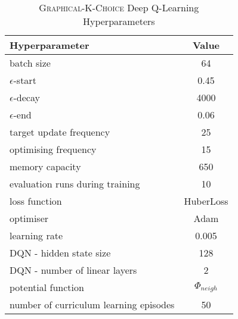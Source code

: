 \begin{table}[h!]\label{tab:graphical-k-choice-hyperparameters}
\begin{threeparttable}
\caption{\textsc{Graphical-K-Choice} Deep Q-Learning Hyperparameters}
\centering
\begin{tabular}{l|c}
\toprule
Hyperparameter             &     Value \\
\midrule
batch size               &     64 \\ 
$\epsilon$-start               &    0.45 \\ 
$\epsilon$-decay         &     4000\\
$\epsilon$-end              &     0.06 \\
target update frequency               &     25 \\ 
optimising frequency          &     15 \\ 
memory capacity     &     650 \\
evaluation runs during training             &     10 \\
loss function               &     HuberLoss \\ 
optimiser        &     Adam \\
learning rate             &     0.005 \\
DQN - hidden state size               &     128 \\ 
DQN - number of linear layers     &     2 \\
potential function            &    $\Phi_{neigh}$ \\
number of curriculum learning episodes            & 50 \\ 
\bottomrule
\end{tabular}
\end{threeparttable}
\end{table}